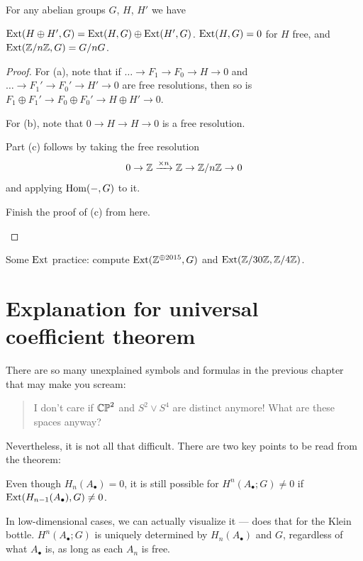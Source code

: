 \begin{lemma}
	For any abelian groups $G$, $H$, $H'$ we have
	\begin{enumerate}[(a)]
		\ii $\operatorname{Ext}(H \oplus H', G) = \operatorname{Ext}(H, G) \oplus \operatorname{Ext}(H', G)$.
		\ii $\operatorname{Ext}(H,G) = 0$ for $H$ free, and
		\ii $\operatorname{Ext}(\mathbb Z/n\mathbb Z, G) = G / nG$.
	\end{enumerate}
\end{lemma}
\begin{proof}
	For (a), note that if $\dots \to F_1 \to F_0 \to H \to 0$
	and $\dots \to F_1' \to F_0' \to H' \to 0$ are free resolutions,
	then so is $F_1 \oplus F_1' \to F_0 \oplus F_0' \to H \oplus H' \to 0$.

	For (b), note that $0 \to H \to H \to 0$ is a free resolution.

	Part (c) follows by taking the free resolution
	\[ 0 \to \mathbb Z \xrightarrow{\times n} \mathbb Z \to \mathbb Z/n\mathbb Z \to 0 \]
	and applying $\operatorname{Hom}(-,G)$ to it.
	\begin{ques}
		Finish the proof of (c) from here. \qedhere
	\end{ques}
\end{proof}

\begin{ques}
	Some $\operatorname{Ext}$ practice: compute
	$\operatorname{Ext}(\mathbb Z^{\oplus 2015}, G)$ and $\operatorname{Ext}(\mathbb Z/30\mathbb Z, \mathbb Z/4\mathbb Z)$.
\end{ques}

\section{Explanation for universal coefficient theorem}

There are so many unexplained symbols and formulas in the previous chapter that may make you scream:
\begin{quote}
	I don't care if $\mathbb{CP}^2$ and $S^2 \vee S^4$ are distinct anymore! What are these spaces anyway?
\end{quote}
Nevertheless, it is not all that difficult. There are two key points to be read from the theorem:
\begin{itemize}
	\ii Even though $H_n(A_\bullet) = 0$, it is still possible for $H^n(A_\bullet; G) \neq 0$
	if $\operatorname{Ext}(H_{n-1}(A_\bullet), G) \neq 0$.

	In low-dimensional cases, we can actually visualize it --- 
	does that for the Klein bottle.
	\ii $H^n(A_\bullet; G)$ is uniquely determined by $H_n(A_\bullet)$ and $G$, regardless of what
	$A_\bullet$ is, as long as each $A_n$ is free.
\end{itemize}

